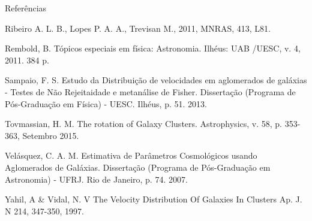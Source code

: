 \documentclass[xcolor=dvipsnames,10pt]{beamer}
\begin{document}
\begin{frame}{Referências}
  \begin{thebibliography}{9}
  \fontsize{8}{0}\selectfont
  Ribeiro A. L. B., Lopes P. A. A., Trevisan M., 2011, MNRAS, 413, L81.

  Rembold, B. Tópicos especiais em física: Astronomia. Ilhéus: UAB /UESC, v. 4, 2011. 384 p.

  Sampaio, F. S. Estudo da Distribuição de velocidades em aglomerados de galáxias - Testes de Não Rejeitaidade e
  metanálise de Fisher. Dissertação (Programa de Pós-Graduação em Física) - UESC. Ilhéus, p. 51. 2013.

  Tovmassian, H. M. The rotation of Galaxy Clusters. Astrophysics, v. 58, p. 353-363, Setembro 2015.

  Velásquez, C. A. M. Estimativa de Parâmetros Cosmológicos usando Aglomerados de Galáxias. Dissertação
  (Programa de Pós-Graduação em Astronomia) - UFRJ. Rio de Janeiro, p. 74. 2007.

  Yahil, A \& Vidal, N. V The Velocity Distribution Of Galaxies In Clusters Ap. J. N 214, 347-350, 1997.
  \end{thebibliography}
\end{frame}
\end{document}
